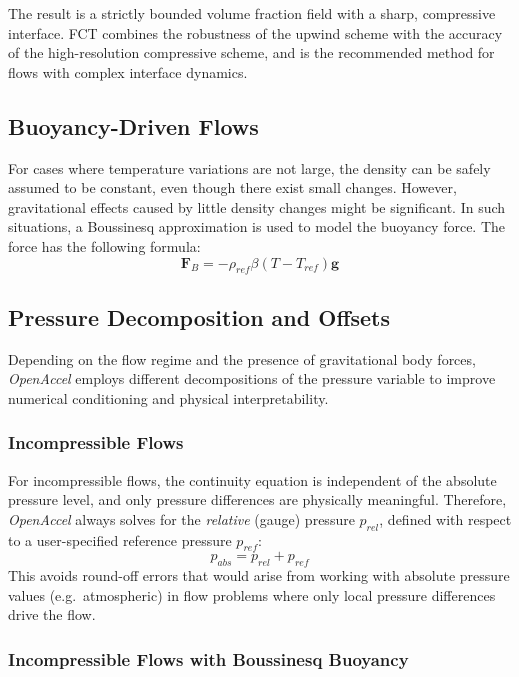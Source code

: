 \documentclass[12pt]{extarticle}
\newcommand{\<}{\langle}
\renewcommand{\>}{\rangle}
\theoremstyle{definition}
\begin{document}
The result is a strictly bounded volume fraction field with a sharp, compressive interface. FCT combines the robustness of the upwind scheme with the accuracy of the high-resolution compressive scheme, and is the recommended method for flows with complex interface dynamics.

\subsection{Buoyancy-Driven Flows}
For cases where temperature variations are not large, the density can be safely assumed to be constant, even though there exist small changes. However, gravitational effects caused by little density changes might be significant. In such situations, a Boussinesq approximation is used to model the buoyancy force. The force has the following formula:
\begin{equation}
    \textbf{F}_{B} = -\rho_{ref} \beta \left(T - T_{ref}\right) \textbf{g}
\end{equation}

\subsection{Pressure Decomposition and Offsets}

Depending on the flow regime and the presence of gravitational body forces, \textit{OpenAccel} employs different decompositions of the pressure variable to improve numerical conditioning and physical interpretability.

\subsubsection{Incompressible Flows}

For incompressible flows, the continuity equation is independent of the absolute pressure level, and only pressure differences are physically meaningful. Therefore, \textit{OpenAccel} always solves for the \textit{relative} (gauge) pressure $p_{rel}$, defined with respect to a user-specified reference pressure $p_{ref}$:
\begin{equation}
    p_{abs} = p_{rel} + p_{ref}
\end{equation}
This avoids round-off errors that would arise from working with absolute pressure values (e.g.\ atmospheric) in flow problems where only local pressure differences drive the flow.

\subsubsection{Incompressible Flows with Boussinesq Buoyancy}
\end{document}
